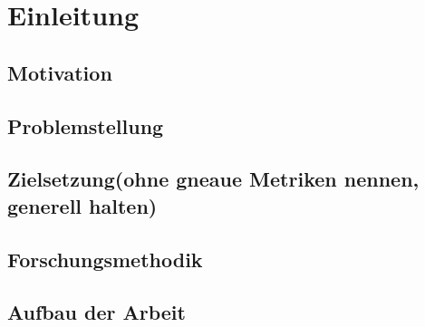 \chapter{Einleitung}


\section{Motivation}
\section{Problemstellung}
\section{Zielsetzung(ohne gneaue Metriken nennen, generell halten)}
\section{Forschungsmethodik}
\section{Aufbau der Arbeit}